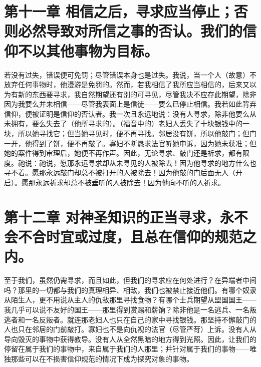 
\section{第十一章 相信之后，寻求应当停止；否则必然导致对所信之事的否认。我们的信仰不以其他事物为目标。}

若没有过失，错误便可免罚；尽管错误本身也是过失。我说，当一个人（故意）不放弃任何事物时，他漫游是免罚的。然而，若我相信了我所应当相信的，后来又以为有新的东西要寻求，我自然期望还有别的可寻见，尽管我决不应存此期望，除非因为我要么并未相信——尽管我表面上是信徒——要么已停止相信。我若如此背弃信仰，便被证明是信仰的否认者。我一次且永远地说：没有人寻求，除非他要么从未拥有，要么失去了（他所寻求的）。（福音中的）老妇人丢失了十块银钱中的一块，所以她寻找它；但当她寻见时，便不再寻找。邻居没有饼，所以他敲门；但门一开，他得到了饼，便不再敲了。寡妇不断恳求法官听她申诉，因为她未获准；但她的案件得到审理后，她便不再作声。因此，无论寻求、敲门还是祈求，都有限度。祂说：祂说，愿那永远寻求却从未寻见的人被除去！因为他寻求的地方什么也寻不着。愿那永远敲门却总不被打开的人被除去！因为他敲的门后面无人（开启）。愿那永远祈求却总不被垂听的人被除去！因为他向不听的人祈求。\par


\section{第十二章 对神圣知识的正当寻求，永不会不合时宜或过度，且总在信仰的规范之内。}

至于我们，虽然仍需寻求，而且如此，但我们的寻求应在何处进行？在异端者中间吗？那里的一切都与我们的真理相异、相敌，我们也被禁止接近他们。有哪个奴隶从陌生人，更不用说从主人的仇敌那里寻找食物？有哪个士兵期望从盟国国王——我几乎可以说不友好的国王——那里得到赏赐和薪饷？除非他是一名逃兵、一名叛逃者和一名反叛者。就连那老妇人也只在自己的家中寻找银钱。那坚持不懈敲门的人也只在邻居的门前敲打。寡妇也不是向仇视的法官（尽管严苛）上诉。没有人从导向毁灭的事物中获得教导。没有人从全然黑暗的地方得到光照。因此，让我们的停留在属于我们的事物中，来自属于我们的人那里；并针对属于我们的事物——唯独那些可以在不损害信仰规范的情况下成为探究对象的事物。\par

